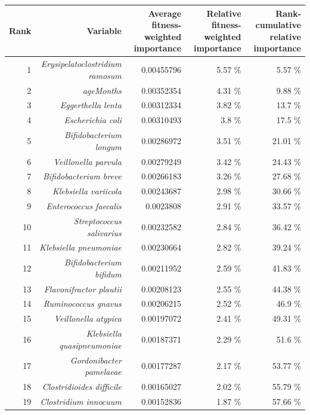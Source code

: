 \documentclass{article}
\begin{document}
\begin{table}[h]
    \begin{centering}
    \tiny
    \begin{tabular}{|r|r|r|r|r|}
      \hline\hline
      \textbf{Rank} & \textbf{Variable} & \textbf{Average fitness-weighted importance} & \textbf{Relative fitness-weighted importance} & \textbf{Rank-cumulative relative importance } \\\hline
      1 & \textit{Erysipelatoclostridium ramosum} & 0.00455796 & 5.57 \% & 5.57 \% \\
      2 & \textit{ageMonths} & 0.00352354 & 4.31 \% & 9.88 \% \\
      3 & \textit{Eggerthella lenta} & 0.00312334 & 3.82 \% & 13.7 \% \\
      4 & \textit{Escherichia coli} & 0.00310493 & 3.8 \% & 17.5 \% \\
      5 & \textit{Bifidobacterium longum} & 0.00286972 & 3.51 \% & 21.01 \% \\
      6 & \textit{Veillonella parvula} & 0.00279249 & 3.42 \% & 24.43 \% \\
      7 & \textit{Bifidobacterium breve} & 0.00266183 & 3.26 \% & 27.68 \% \\
      8 & \textit{Klebsiella variicola} & 0.00243687 & 2.98 \% & 30.66 \% \\
      9 & \textit{Enterococcus faecalis} & 0.0023808 & 2.91 \% & 33.57 \% \\
      10 & \textit{Streptococcus salivarius} & 0.00232582 & 2.84 \% & 36.42 \% \\
      11 & \textit{Klebsiella pneumoniae} & 0.00230664 & 2.82 \% & 39.24 \% \\
      12 & \textit{Bifidobacterium bifidum} & 0.00211952 & 2.59 \% & 41.83 \% \\
      13 & \textit{Flavonifractor plautii} & 0.00208123 & 2.55 \% & 44.38 \% \\
      14 & \textit{Ruminococcus gnavus} & 0.00206215 & 2.52 \% & 46.9 \% \\
      15 & \textit{Veillonella atypica} & 0.00197072 & 2.41 \% & 49.31 \% \\
      16 & \textit{Klebsiella quasipneumoniae} & 0.00187371 & 2.29 \% & 51.6 \% \\
      17 & \textit{Gordonibacter pamelaeae} & 0.00177287 & 2.17 \% & 53.77 \% \\
      18 & \textit{Clostridioides difficile} & 0.00165027 & 2.02 \% & 55.79 \% \\
      19 & \textit{Clostridium innocuum} & 0.00152836 & 1.87 \% & 57.66 \% \\

\end{tabular}
\end{centering}
\end{table}
\end{document}
